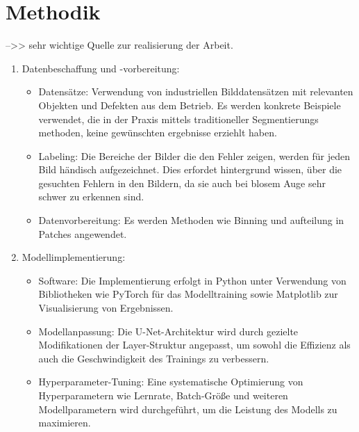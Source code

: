 \chapter{Methodik}\label{sec:exp_methodik}
\cite{arafin_deep_2024} -->> sehr wichtige Quelle zur realisierung der Arbeit.
\begin{enumerate}
    \item Datenbeschaffung und -vorbereitung:
    
    \begin{itemize}
        \item Datensätze: Verwendung von industriellen Bilddatensätzen mit relevanten Objekten und Defekten aus dem Betrieb. Es werden konkrete Beispiele verwendet, die in der Praxis mittels traditioneller Segmentierungs methoden, keine gewünschten ergebnisse erziehlt haben.
        \item Labeling: Die Bereiche der Bilder die den Fehler zeigen, werden für jeden Bild händisch aufgezeichnet. Dies erfordet hintergrund wissen, über die gesuchten Fehlern in den Bildern, da sie auch bei blosem Auge sehr schwer zu erkennen sind.
        \item Datenvorbereitung: Es werden Methoden wie Binning und aufteilung in Patches angewendet.
    \end{itemize}
    
    \item Modellimplementierung:
    \begin{itemize}
        \item Software: Die Implementierung erfolgt in Python unter Verwendung von Bibliotheken wie PyTorch für das Modelltraining sowie Matplotlib zur Visualisierung von Ergebnissen.
        \item Modellanpassung: Die U-Net-Architektur wird durch gezielte Modifikationen der Layer-Struktur angepasst, um sowohl die Effizienz als auch die Geschwindigkeit des Trainings zu verbessern.
        \item Hyperparameter-Tuning: Eine systematische Optimierung von Hyperparametern wie Lernrate, Batch-Größe und weiteren Modellparametern wird durchgeführt, um die Leistung des Modells zu maximieren.
    \end{itemize}
    

\end{enumerate}
